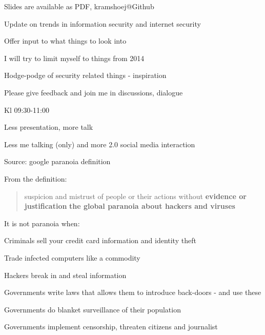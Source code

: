 \documentclass[20pt,landscape,a4paper,footrule]{foils}
\begin{document}


\vskip 2cm
\centerline{\footnotesize Slides are available as PDF, kramshoej@Github}


\Bart

\begin{list1}
\item Update on trends in information security and internet security
\item Offer input to what things to look into
\vskip 2cm
\item I will try to limit myself to things from 2014
\item Hodge-podge of security related things - inspiration 
\item Please give feedback and join me in discussions, dialogue \smiley
\end{list1}



\begin{list1}
\item Kl 09:30-11:00
\item Less presentation, more talk 
\item Less me talking (only) and more 2.0 social media interaction
\end{list1}




Source: google paranoia definition


From the definition:
\begin{quote}
suspicion and mistrust of people or their actions without {\bf evidence or justification}
{\bf the global paranoia about hackers and viruses}
\end{quote}

\begin{list1}
\item It is not paranoia when:
\begin{list2}
\item Criminals sell your credit card information and identity theft
\item Trade infected computers like a commodity
\item Hackers break in and steal information
\item Governments write laws that allows them to introduce back-doors - and use these
\item Governments do blanket surveillance of their population
\item Governments implement censorship, threaten citizens and journalist
\end{list2}
\end{list1}
\end{document}
